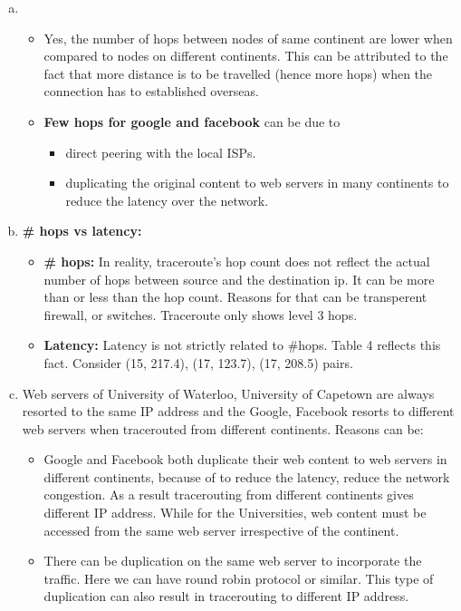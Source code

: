 \documentclass{article}
\begin{document}
    \begin{enumerate}[a)]
        \item
        \begin{itemize}
            \item Yes, the number of hops between nodes of same continent are lower when compared to nodes on different continents. This can be attributed to the fact that more distance is to be travelled (hence more hops) when the connection has to established overseas. 
            \item \textbf{Few hops for google and facebook} can be due to
            \begin{itemize}
                \item direct peering with the local ISPs.
                \item duplicating the original content to web servers in many continents to reduce the latency over the network.
            \end{itemize}{}
        \end{itemize}{}
        \item \textbf{\# hops vs latency:}
            \begin{itemize}
                \item \textbf{\# hops: } In reality, traceroute's hop count does not reflect the actual number of hops between source and the destination ip. It can be more than or less than the hop count. Reasons for that can be transperent firewall,  or switches. Traceroute only shows level 3 hops.
                \item \textbf{Latency: } Latency is not strictly related to \#hops. Table 4 reflects this fact. Consider (15, 217.4), (17, 123.7), (17, 208.5) pairs.
            \end{itemize}{}
        \item Web servers of University of Waterloo, University of Capetown are always resorted to the same IP address and the Google, Facebook resorts to different web servers when tracerouted from different continents. Reasons can be:
        \begin{itemize}
            \item Google and Facebook both duplicate their web content to web servers in different continents, because of to reduce the latency, reduce the network congestion. As a result tracerouting from different continents gives different IP address. While for the Universities, web content must be accessed from the same web server irrespective of the continent.
            \item There can be duplication on the same web server to incorporate the traffic. Here we can have round robin protocol or similar. This type of duplication can also result in tracerouting to different IP address. 

\end{itemize}
\end{enumerate}
\end{document}
